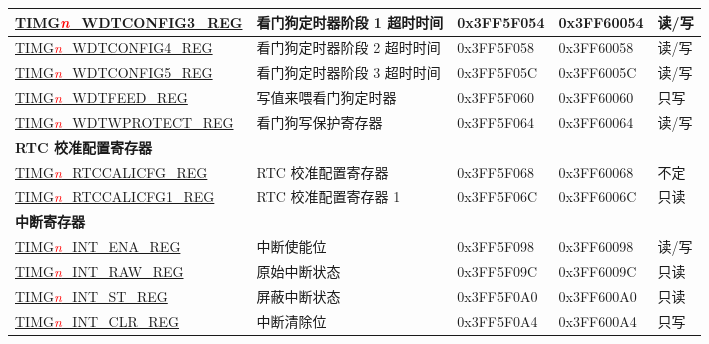 \begin{longtable}{ | p{5cm} | p{5.6cm} | p{1.8cm} | p{1.8cm} | p{0.8cm} | }
\hyperref[regdesc:TIMERSWDTCONFIG3REG]{TIMG\textcolor{red}{\it{n}}\_WDTCONFIG3\_REG} & 看门狗定时器阶段 1 超时时间 & 0x3FF5F054 & 0x3FF60054 & 读/写 \\ \hline
\hyperref[regdesc:TIMERSWDTCONFIG4REG]{TIMG\textcolor{red}{\it{n}}\_WDTCONFIG4\_REG} & 看门狗定时器阶段 2 超时时间 & 0x3FF5F058 & 0x3FF60058 & 读/写 \\ \hline
\hyperref[regdesc:TIMERSWDTCONFIG5REG]{TIMG\textcolor{red}{\it{n}}\_WDTCONFIG5\_REG} & 看门狗定时器阶段 3 超时时间 & 0x3FF5F05C & 0x3FF6005C & 读/写 \\ \hline
\hyperref[regdesc:TIMERSWDTFEEDREG]{TIMG\textcolor{red}{\it{n}}\_WDTFEED\_REG} & 写值来喂看门狗定时器 & 0x3FF5F060 & 0x3FF60060 & 只写 \\ \hline
\hyperref[regdesc:TIMERSWDTWPROTECTREG]{TIMG\textcolor{red}{\it{n}}\_WDTWPROTECT\_REG} & 看门狗写保护寄存器 & 0x3FF5F064 & 0x3FF60064 & 读/写 \\ \hline
\multicolumn{5}{|l|}{\textbf{RTC 校准配置寄存器}} \\ \hline
\hyperref[regdesc:TIMGRTCCALICFGREG]{TIMG\textcolor{red}{\it{n}}\_RTCCALICFG\_REG} & RTC 校准配置寄存器 & 0x3FF5F068 & 0x3FF60068 & 不定 \\ \hline
\hyperref[regdesc:TIMGRTCCALICFG1REG]{TIMG\textcolor{red}{\it{n}}\_RTCCALICFG1\_REG} & RTC 校准配置寄存器 1 & 0x3FF5F06C & 0x3FF6006C & 只读 \\ \hline
\multicolumn{5}{|l|}{\textbf{中断寄存器}} \\ \hline
\hyperref[regdesc:TIMERSINTENAREG]{TIMG\textcolor{red}{\it{n}}\_INT\_ENA\_REG} & 中断使能位 & 0x3FF5F098 & 0x3FF60098 & 读/写 \\ \hline
\hyperref[regdesc:TIMERSINTRAWREG]{TIMG\textcolor{red}{\it{n}}\_INT\_RAW\_REG} & 原始中断状态 & 0x3FF5F09C & 0x3FF6009C & 只读 \\ \hline
\hyperref[regdesc:TIMERSINTSTREG]{TIMG\textcolor{red}{\it{n}}\_INT\_ST\_REG} & 屏蔽中断状态 & 0x3FF5F0A0 & 0x3FF600A0 & 只读 \\ \hline
\hyperref[regdesc:TIMERSINTCLRREG]{TIMG\textcolor{red}{\it{n}}\_INT\_CLR\_REG} & 中断清除位 & 0x3FF5F0A4 & 0x3FF600A4 & 只写 \\ \hline
\end{longtable}